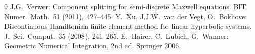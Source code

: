 \documentclass[11pt,a4paper]{article}
\begin{document}
\begin{thebibliography}{9}
 J.G.~Verwer: Component splitting for semi-discrete Maxwell equations. BIT Numer.\ Math.\
51 (2011), 427--445.
 Y.~Xu, J.J.W.~van der Vegt, O.~Bokhove: Discontinuous Hamiltonian finite element method for linear
hyperbolic systems. J.\ Sci.\ Comput.\ 35 (2008), 241--265.
 E.~Hairer, C.~Lubich, G.~Wanner: Geometric Numerical Integration, 2nd ed. Springer 2006.
\end{thebibliography}
\end{document}
